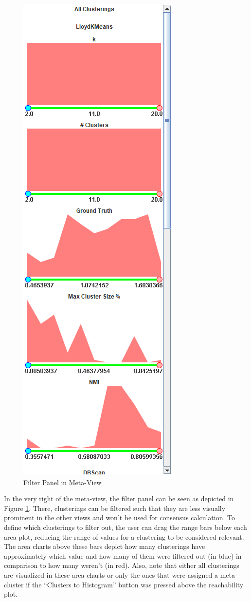 \documentclass[
	a4paper,
	english,
	twoside,
	openright,               
	11pt                            
	]{report}
\begin{document}
\begin{figure}[h]
	\centering
	\includegraphics[scale=.5]{filter-panel}
	\caption{Filter Panel in Meta-View}
	\label{fig:filterpanel}
\end{figure}

In the very right of the meta-view, the filter panel can be seen as depicted in Figure \ref{fig:filterpanel}. There, clusterings can be filtered such that they are less visually prominent in the other views and won't be used for consensus calculation. To define which clusterings to filter out, the user can drag the range bars below each area plot, reducing the range of values for a clustering to be considered relevant. The area charts above these bars depict how many clusterings have approximately which value and how many of them were filtered out (in blue) in comparison to how many weren't (in red). Also, note that either all clusterings are visualized in these area charts or only the ones that were assigned a meta-cluster if the ``Clusters to Histogram'' button was pressed above the reachability plot.
\end{document}
